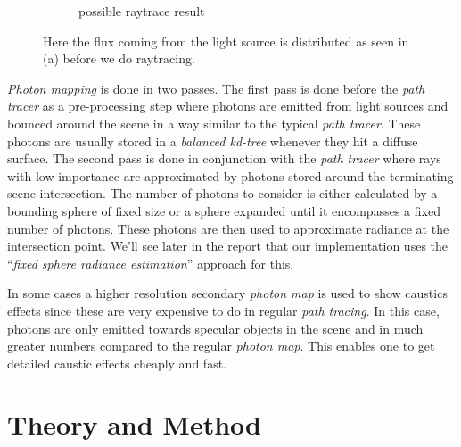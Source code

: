 \documentclass[a4paper, twocolumn]{article}
\begin{document}
\begin{figure}[ht]
\begin{subfigure}{0.498\linewidth}
            \caption{possible raytrace result}
        \end{subfigure}
        \caption{Here the flux coming from the light source is distributed as seen in (a) before we do raytracing.}
        \label{fig:photon_mapping}
    \end{figure}

    \vspace{-0.25em}

    \textit{Photon mapping} is done in two passes. The first pass is done before the \textit{path tracer} as a pre-processing step where photons are emitted from light sources and bounced around the scene in a way similar to the typical \textit{path tracer}. These photons are usually stored in a \emph{balanced kd-tree} whenever they hit a diffuse surface. The second pass is done in conjunction with the \textit{path tracer} where rays with low importance are approximated by photons stored around the terminating scene-intersection. The number of photons to consider is either calculated by a bounding sphere of fixed size or a sphere expanded until it encompasses a fixed number of photons. These photons are then used to approximate radiance at the intersection point. We'll see later in the report that our implementation uses the ``\emph{fixed sphere radiance estimation}'' approach for this.

In some cases a higher resolution secondary \textit{photon map} is used to show caustics effects since these are very expensive to do in regular \textit{path tracing}. In this case, photons are only emitted towards specular objects in the scene and in much greater numbers compared to the regular \textit{photon map}. This enables one to get detailed caustic effects cheaply and fast.

    \section{Theory and Method} \label{sec:theory_and_method}
\end{document}
